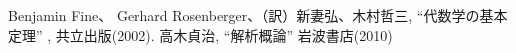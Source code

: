 \documentclass[10pt]{jarticle}
\begin{document}
\newpage

\begin{thebibliography}{9}
   Benjamin Fine、 Gerhard Rosenberger、（訳）新妻弘、木村哲三,
    ``代数学の基本定理'' ,
    共立出版(2002).
   高木貞治,
    ``解析概論'' 岩波書店(2010)
\end{thebibliography}
\end{document}
